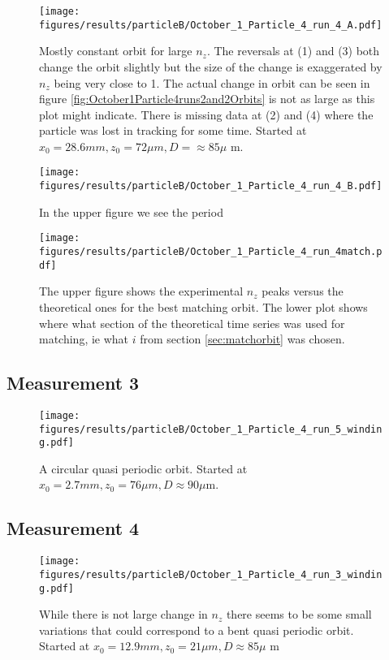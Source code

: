 \begin{figure}[H]
\begin{center}
\texttt{[image: figures/results/particleB/October\_1\_Particle\_4\_run\_4\_A.pdf]}
\end{center}
\caption{Mostly constant orbit for large $n_z$. The reversals at (1) and (3) both change the orbit slightly but the size of the change is exaggerated by $n_z$ being very close to 1. The actual change in orbit can be seen in figure \ref{fig:October1Particle4runs2and2Orbits} is not as large as this plot might indicate. There is missing data at (2) and (4) where the particle was lost in tracking for some time. Started at $x_0 = 28.6 mm, z_0 = 72\mu m, D = \approx 85\mu$ m. }
\label{fig:particleB2}
\end{figure}

\begin{figure}[H]
\centering
\texttt{[image: figures/results/particleB/October\_1\_Particle\_4\_run\_4\_B.pdf]}
\caption{In the upper figure we see the period }
\label{fig:particleB2sinking}
\end{figure}

\begin{figure}[H]
\centering
\texttt{[image: figures/results/particleB/October\_1\_Particle\_4\_run\_4match.pdf]}
\caption{The upper figure shows the experimental $n_z$ peaks versus the theoretical ones for the best matching orbit. The lower plot shows where what section of the theoretical time series was used for matching, ie what $i$ from section \ref{sec:matchorbit} was chosen.}
\label{fig:particleB2match}
\end{figure}




\subsection{Measurement 3}
\begin{figure}[H]
\begin{center}
\texttt{[image: figures/results/particleB/October\_1\_Particle\_4\_run\_5\_winding.pdf]}
\end{center}
\caption{A circular quasi periodic orbit. Started at $x_0 = 2.7 mm, z_0 = 76\mu m, D \approx 90\mu$m.}
\label{fig:particleB3}
\end{figure}




\subsection{Measurement 4}
\begin{figure}[H]
\begin{center}
\texttt{[image: figures/results/particleB/October\_1\_Particle\_4\_run\_3\_winding.pdf]}
\end{center}
\caption{While there is not large change in $n_z$ there seems to be some small variations that could correspond to a bent quasi periodic orbit. Started at $x_0 = 12.9 mm, z_0 = 21\mu m, D \approx 85\mu$ m}
\label{fig:particleB4}
\end{figure}
